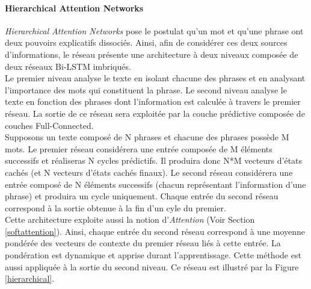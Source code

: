 \paragraph{Hierarchical Attention Networks}
\textit{Hierarchical Attention Networks}\cite{hierarchical} pose le postulat qu'un mot et qu'une phrase ont deux pouvoirs explicatifs dissociés. Ainsi, afin de considérer ces deux sources d'informations, le réseau présente une architecture à deux niveaux composée de deux réseaux Bi-LSTM imbriqués. \\

\noindent Le premier niveau analyse le texte en isolant chacune des phrases et en analysant l'importance des mots qui constituent la phrase. Le second niveau analyse le texte en fonction des phrases dont l'information est calculée à travers le premier réseau. La sortie de ce réseau sera exploitée par la couche prédictive composée de couches Full-Connected.\\

\noindent Supposons un texte composé de N phrases et chacune des phrases possède M mots. Le premier réseau considérera une entrée composée de M éléments successifs et réaliseras N cycles prédictifs. Il produira donc N*M vecteurs d'états cachés (et N vecteurs d'états cachés finaux). Le second réseau considérera une entrée composé de N éléments successifs (chacun représentant l'information d'une phrase) et produira un cycle uniquement. Chaque entrée du second réseau correspond à la sortie obtenue à la fin d'un cyle du premier.\\

\noindent Cette architecture exploite aussi la notion d'\textit{Attention} (Voir Section \ref{softattention}). Ainsi, chaque entrée du second réseau correspond à une moyenne pondérée des vecteurs de contexte du premier réseau liés à cette entrée. La pondération est dynamique et apprise durant l'apprentissage. Cette méthode est aussi appliquée à la sortie du second niveau. Ce réseau est illustré par la Figure \ref{hierarchical}.


